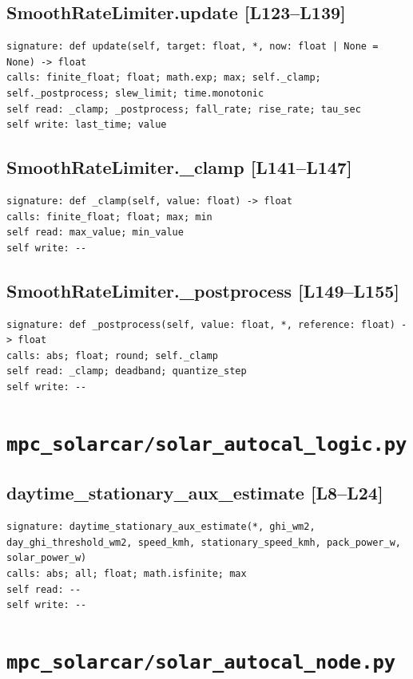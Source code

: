 \documentclass[a4paper,10pt,oneside]{book}
\begin{document}
\subsection*{SmoothRateLimiter.update [L123--L139]}
\begin{lstlisting}[numbers=none]
signature: def update(self, target: float, *, now: float | None = None) -> float
calls: finite_float; float; math.exp; max; self._clamp; self._postprocess; slew_limit; time.monotonic
self read: _clamp; _postprocess; fall_rate; rise_rate; tau_sec
self write: last_time; value
\end{lstlisting}
\subsection*{SmoothRateLimiter.\_clamp [L141--L147]}
\begin{lstlisting}[numbers=none]
signature: def _clamp(self, value: float) -> float
calls: finite_float; float; max; min
self read: max_value; min_value
self write: --
\end{lstlisting}
\subsection*{SmoothRateLimiter.\_postprocess [L149--L155]}
\begin{lstlisting}[numbers=none]
signature: def _postprocess(self, value: float, *, reference: float) -> float
calls: abs; float; round; self._clamp
self read: _clamp; deadband; quantize_step
self write: --
\end{lstlisting}
\section{\texttt{mpc\_solarcar/solar\_autocal\_logic.py}}
\subsection*{daytime\_stationary\_aux\_estimate [L8--L24]}
\begin{lstlisting}[numbers=none]
signature: daytime_stationary_aux_estimate(*, ghi_wm2, day_ghi_threshold_wm2, speed_kmh, stationary_speed_kmh, pack_power_w, solar_power_w)
calls: abs; all; float; math.isfinite; max
self read: --
self write: --
\end{lstlisting}
\section{\texttt{mpc\_solarcar/solar\_autocal\_node.py}}
\end{document}
